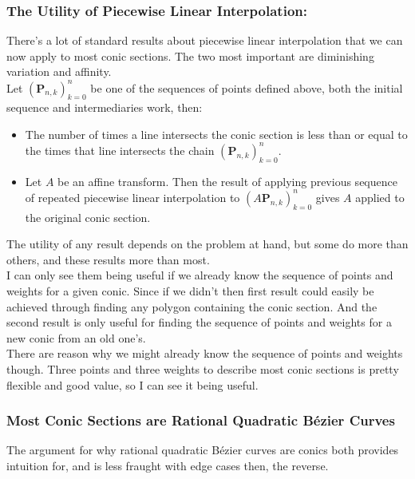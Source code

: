 \subsubsection{The Utility of Piecewise Linear Interpolation:}
There's a lot of standard results about piecewise linear interpolation that we can now apply to most conic sections.
The two most important are diminishing variation and affinity.
\\

Let $(\mathbf{P}_{n,k})_{k=0}^{n}$ be one of the sequences of points defined above,
both the initial sequence and intermediaries work, then:
\begin{itemize}
\item The number of times a line intersects the conic section is less than or equal to the times that line intersects the chain $(\mathbf{P}_{n,k})_{k=0}^{n}$.
\item Let $A$ be an affine transform. Then the result of applying previous sequence of repeated piecewise linear interpolation to $(A\mathbf{P}_{n,k})_{k=0}^{n}$ gives $A$ applied to the original conic section.
\end{itemize}
The utility of any result depends on the problem at hand,
but some do more than others,
and these results more than most.
\\

I can only see them being useful if we already know the sequence of points and weights for a given conic.
Since if we didn't then first result could easily be achieved through finding any polygon containing the conic section.
And the second result is only useful for finding the sequence of points and weights for a new conic from an old one's.
\\

There are reason why we might already know the sequence of points and weights though.
Three points and three weights to describe most conic sections is pretty flexible and good value,
so I can see it being useful.

\subsubsection{Most Conic Sections are Rational Quadratic Bézier Curves}
The argument for why rational quadratic Bézier curves are conics both provides intuition for,
and is less fraught with edge cases then, the reverse.
\\

